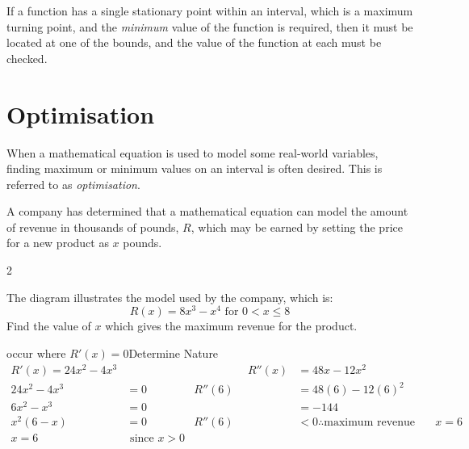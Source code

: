 \documentclass[
  11pt,
  openany]{book}
\begin{document}
If a function has a single stationary point within an interval, which is a maximum turning point, and the \textit{minimum} value of the function is required, then it must be located at one of the bounds, and the value of the function at each must be checked.

\pagebreak

\section{Optimisation}\label{optimisation}

When a mathematical equation is used to model some real-world variables, finding maximum or minimum values on an interval is often desired. This is referred to as \textit{optimisation}.

\begin{tcolorbox}[title=Example 9.5.1,colback=blue!1, colframe=blue!70!black!70!]
A company has determined that a mathematical equation can model the amount of revenue in thousands of pounds, $R$, which may be earned by setting the price for a new product as $x$ pounds.
    \vspace{-0.5cm}
    \begin{multicols}{2}
    \begin{center}
    \end{center}
    The diagram illustrates the model used by the company, which is:
    $$R(x)=8x^3-x^4\text{ for }0< x \leqslant 8$$
    Find the value of $x$ which gives the maximum revenue for the product.
    \end{multicols}

\tcblower


\textcolor{blue!70!black!70!}{} occur where $R'(x)=0$\hspace{1cm}\textcolor{blue!70!black!70!}{Determine Nature}
\vspace{-0.2cm}
\begin{align*}
    R'(x)=24x^2-4x^3&&\hspace{2cm}R''(x)&=48x-12x^2\\
    24x^2-4x^3&=0&R''(6)&=48(6)-12(6)^2\\
    6x^2-x^3&=0&&=-144\\
    x^2(6-x)&=0&R''(6)&<0\therefore \text{maximum revenue when }x=6\\
    x=6&\text{ since }x>0
\end{align*}

\end{tcolorbox}
\end{document}
